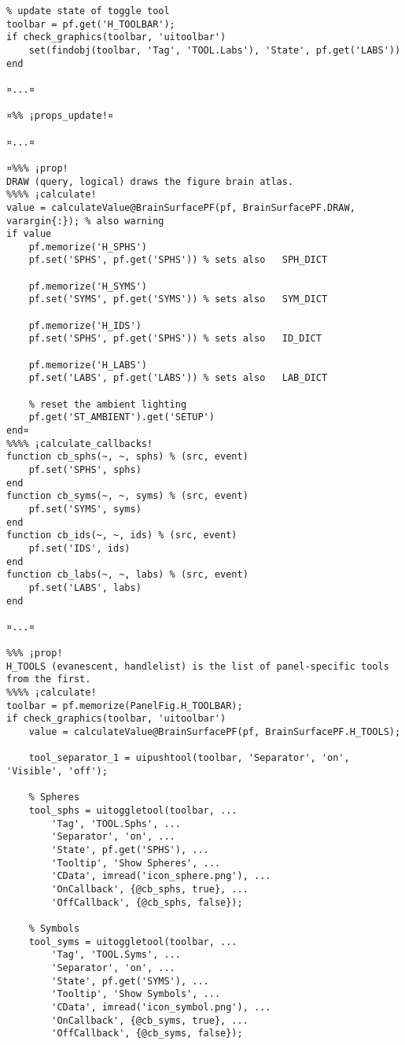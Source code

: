 \documentclass{tufte-handout}
\begin{document}
\begin{lstlisting}
% update state of toggle tool
toolbar = pf.get('H_TOOLBAR');
if check_graphics(toolbar, 'uitoolbar')
    set(findobj(toolbar, 'Tag', 'TOOL.Labs'), 'State', pf.get('LABS'))
end

¤...¤

¤%% ¡props_update!¤

¤...¤

¤%%% ¡prop!
DRAW (query, logical) draws the figure brain atlas.
%%%% ¡calculate!
value = calculateValue@BrainSurfacePF(pf, BrainSurfacePF.DRAW, varargin{:}); % also warning
if value
    pf.memorize('H_SPHS')
    pf.set('SPHS', pf.get('SPHS')) % sets also   SPH_DICT  

    pf.memorize('H_SYMS')
    pf.set('SYMS', pf.get('SYMS')) % sets also   SYM_DICT  

    pf.memorize('H_IDS')
    pf.set('SPHS', pf.get('SPHS')) % sets also   ID_DICT  

    pf.memorize('H_LABS')
    pf.set('LABS', pf.get('LABS')) % sets also   LAB_DICT  

    % reset the ambient lighting
    pf.get('ST_AMBIENT').get('SETUP')
end¤
%%%% ¡calculate_callbacks!
function cb_sphs(~, ~, sphs) % (src, event)
    pf.set('SPHS', sphs)
end
function cb_syms(~, ~, syms) % (src, event)
    pf.set('SYMS', syms)
end
function cb_ids(~, ~, ids) % (src, event)
    pf.set('IDS', ids)
end
function cb_labs(~, ~, labs) % (src, event)
    pf.set('LABS', labs)
end

¤...¤

%%% ¡prop!
H_TOOLS (evanescent, handlelist) is the list of panel-specific tools from the first.
%%%% ¡calculate!
toolbar = pf.memorize(PanelFig.H_TOOLBAR);
if check_graphics(toolbar, 'uitoolbar')
	value = calculateValue@BrainSurfacePF(pf, BrainSurfacePF.H_TOOLS);
    
    tool_separator_1 = uipushtool(toolbar, 'Separator', 'on', 'Visible', 'off');

    % Spheres
    tool_sphs = uitoggletool(toolbar, ...
        'Tag', 'TOOL.Sphs', ...
        'Separator', 'on', ...
        'State', pf.get('SPHS'), ...
        'Tooltip', 'Show Spheres', ...
        'CData', imread('icon_sphere.png'), ...
        'OnCallback', {@cb_sphs, true}, ...
        'OffCallback', {@cb_sphs, false});

    % Symbols
    tool_syms = uitoggletool(toolbar, ...
        'Tag', 'TOOL.Syms', ...
        'Separator', 'on', ...
        'State', pf.get('SYMS'), ...
        'Tooltip', 'Show Symbols', ...
        'CData', imread('icon_symbol.png'), ...
        'OnCallback', {@cb_syms, true}, ...
        'OffCallback', {@cb_syms, false});


\end{lstlisting}
\end{document}
